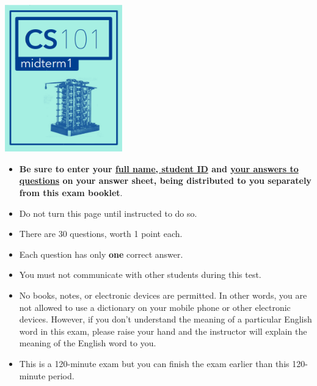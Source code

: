 \documentclass{article}
\newcounter{question}
\begin{document}
\newcount\maxrawpages
\newcount\maxpadpages
\newcount\minpadpages
{}
\newcount\padcount

\cleardoublepage

\setcounter{page}{1}


\begin{center}
%
\includegraphics[width=2in]{../img/midterm1-header.png}
\end{center}

\bigskip
\noindent
\begin{itemize}
\item \textbf{Be sure to enter your \underline{full name, student ID} and \underline{your answers to questions} on your answer sheet, being distributed to you separately from this exam booklet}.
\item Do not turn this page until instructed to do so.
\item There are 30 questions, worth 1 point each.
\item Each question has only \textbf{one} correct answer.
\item You must not communicate with other students during this test.
\item No books, notes, or electronic devices are permitted. In other words, you are not allowed to use a dictionary on your mobile phone or other electronic devices. However, if you don't understand the meaning of a particular English word in this exam, please raise your hand and the instructor will explain the meaning of the English word to you. 
\item This is a 120-minute exam but you can finish the exam earlier than this 120-minute period.
\end{itemize}
\end{document}
